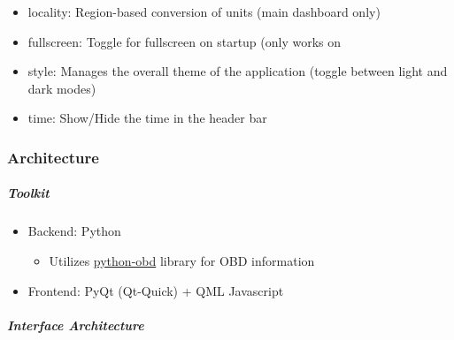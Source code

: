 \documentclass{article}
\providecommand{\tightlist}{%
  \setlength{\itemsep}{0pt}\setlength{\parskip}{0pt}}
\begin{document}
\begin{itemize}
  \item 
    locality: Region-based conversion of units (main dashboard only)
\end{itemize}
\begin{itemize}
  \item 
    fullscreen: Toggle for fullscreen on startup (only works on
\end{itemize}
\begin{itemize}
  \item 
    style: Manages the overall theme of the application (toggle between light and dark modes)
\end{itemize}
\begin{itemize}
  \item 
    time: Show/Hide the time in the header bar
\end{itemize}

\hypertarget{architecture}{%
\subsubsection{Architecture}\label{architecture}}

\hypertarget{toolkit}{%
\subparagraph{Toolkit}\label{Toolkit}}

\begin{itemize}
\item
  Backend: Python

  \begin{itemize}
  \tightlist
  \item
    Utilizes \href{https://python-obd.readthedocs.io/en/latest/}{python-obd} library for OBD information
  \end{itemize}
\item
  Frontend: PyQt (Qt-Quick) + QML \textbar{} Javascript
\end{itemize}

\hypertarget{interface-architecture}{%
\subparagraph{Interface Architecture}\label{interface-architecture}}
\end{document}
